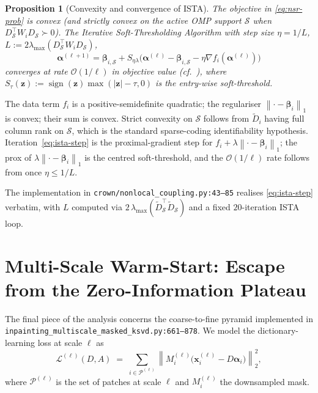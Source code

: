 \documentclass[journal,onecolumn,11pt]{IEEEtran}
\newtheorem{proposition}[theorem]{Proposition}
\theoremstyle{definition}
\newcommand{\Loss}{\mathcal{L}}
\newcommand{\norm}[1]{\left\lVert #1 \right\rVert}
\newcommand{\sign}{\operatorname{sign}}
\newcommand{\xvec}{\bm{x}}
\newcommand{\alphavec}{\bm{\alpha}}
\begin{document}
\begin{proposition}[Convexity and convergence of ISTA]
\label{prop:ista}
The objective in \eqref{eq:nsr-prob} is convex (and strictly convex on
the active OMP support $\mathcal{S}$ when $D_\mathcal{S}^\top W_i D_\mathcal{S}\succ 0$).
The Iterative Soft-Thresholding Algorithm with step size $\eta=1/L$,
$L:=2\lambda_{\max}(D_\mathcal{S}^\top W_i D_\mathcal{S})$,
\begin{equation}
\alphavec^{(\ell+1)}
=\bm{\beta}_{i,\mathcal{S}}+S_{\eta\lambda}\!\bigl(\alphavec^{(\ell)}-\bm{\beta}_{i,\mathcal{S}}-\eta\nabla f_i(\alphavec^{(\ell)})\bigr)
\label{eq:ista-step}
\end{equation}
converges at rate $\mathcal{O}(1/\ell)$ in objective value
(\emph{cf.}\ \cite{beck2009fista}), where $S_\tau(\bm{z}):=\sign(\bm{z})\max(|\bm{z}|-\tau,0)$
is the entry-wise soft-threshold.
\end{proposition}
\begin{IEEEproof}
The data term $f_i$ is a positive-semidefinite quadratic; the
regulariser $\norm{\cdot-\bm{\beta}_i}_1$ is convex; their sum is
convex. Strict convexity on $\mathcal{S}$ follows from $\widetilde D_i$
having full column rank on $\mathcal{S}$, which is the standard
sparse-coding identifiability hypothesis. Iteration~\eqref{eq:ista-step}
is the proximal-gradient step for $f_i+\lambda\norm{\cdot-\bm{\beta}_i}_1$;
the prox of $\lambda\norm{\cdot-\bm{\beta}_i}_1$ is the centred
soft-threshold, and the $\mathcal{O}(1/\ell)$ rate follows from
\cite{beck2009fista} once $\eta\le 1/L$.
\end{IEEEproof}

The implementation in \texttt{crown/nonlocal\_coupling.py:43--85}
realises \eqref{eq:ista-step} verbatim, with $L$ computed via
$2\,\lambda_{\max}(\widetilde D_{\mathcal{S}}^\top\widetilde D_{\mathcal{S}})$
and a fixed $20$-iteration ISTA loop.

\section{Multi-Scale Warm-Start: Escape from the Zero-Information Plateau}
\label{sec:multiscale}

The final piece of the analysis concerns the coarse-to-fine pyramid
implemented in \texttt{inpainting\_multiscale\_masked\_ksvd.py:661--878}.
We model the dictionary-learning loss at scale $\ell$ as
\begin{equation}
\Loss^{(\ell)}(D,A)
\;=\;\sum_{i\in\mathcal{P}^{(\ell)}}\norm{M_i^{(\ell)}\bigl(\xvec_i^{(\ell)}-D\alphavec_i\bigr)}_2^2,
\label{eq:loss-ell}
\end{equation}
where $\mathcal{P}^{(\ell)}$ is the set of patches at scale $\ell$ and
$M_i^{(\ell)}$ the downsampled mask.
\end{document}
